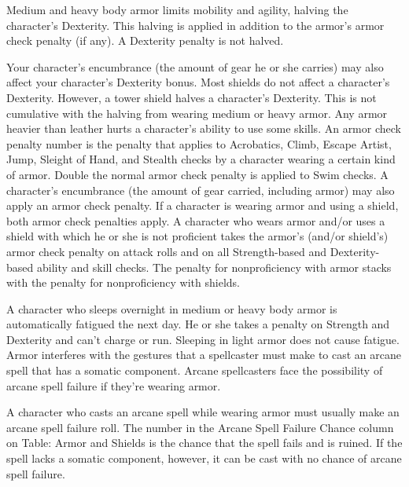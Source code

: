  Medium and heavy body armor limits mobility and agility, halving the character's Dexterity. This halving is applied in addition to the armor's armor check penalty (if any). A Dexterity penalty is not halved.

Your character's encumbrance (the amount of gear he or she carries) may also affect your character's Dexterity bonus.
 Most shields do not affect a character's Dexterity. However, a tower shield halves a character's Dexterity. This is not cumulative with the halving from wearing medium or heavy armor.
 Any armor heavier than leather hurts a character's ability to use some skills. An armor check penalty number is the penalty that applies to Acrobatics, Climb, Escape Artist, Jump, Sleight of Hand, and Stealth checks by a character wearing a certain kind of armor. Double the normal armor check penalty is applied to Swim checks. A character's encumbrance (the amount of gear carried, including armor) may also apply an armor check penalty.
 If a character is wearing armor and using a shield, both armor check penalties apply.
 A character who wears armor and/or uses a shield with which he or she is not proficient takes the armor's (and/or shield's) armor check penalty on attack rolls and on all Strength-based and Dexterity-based ability and skill checks. The penalty for nonproficiency with armor stacks with the penalty for nonproficiency with shields.

 A character who sleeps overnight in medium or heavy body armor is automatically fatigued the next day. He or she takes a  penalty on Strength and Dexterity and can't charge or run. Sleeping in light armor does not cause fatigue.
 Armor interferes with the gestures that a spellcaster must make to cast an arcane spell that has a somatic component. Arcane spellcasters face the possibility of arcane spell failure if they're wearing armor.

 A character who casts an arcane spell while wearing armor must usually make an arcane spell failure roll. The number in the Arcane Spell Failure Chance column on Table: Armor and Shields is the chance that the spell fails and is ruined. If the spell lacks a somatic component, however, it can be cast with no chance of arcane spell failure.

